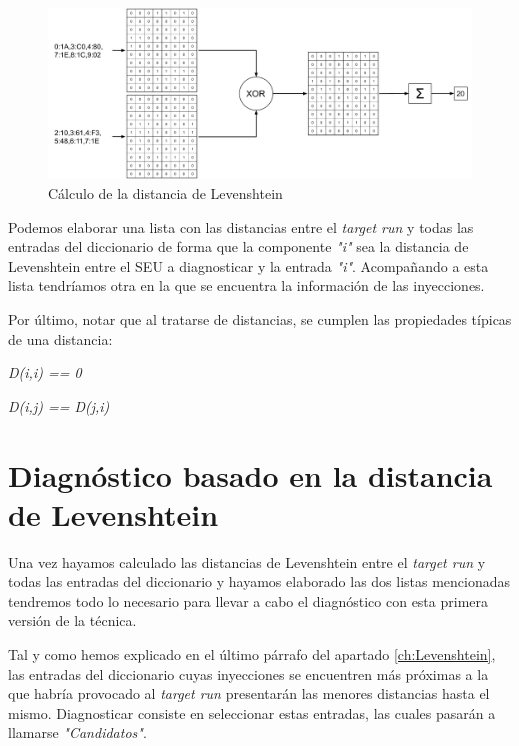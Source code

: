 \begin{figure}[htbp]
    \centering
    \includegraphics[width=0.95\linewidth]
    {Levenshtein/figuras/fig41.pdf}
    \caption{Cálculo de la distancia de Levenshtein}
    \label{fig:LevenDist}
\end{figure}

Podemos elaborar una lista con las distancias entre el \textit{target run} y 
todas las entradas del diccionario de forma que la componente \textit{"i"} sea 
la distancia de Levenshtein entre el \gls{SEU} a diagnosticar y la entrada 
\textit{"i"}. Acompañando a esta lista tendríamos otra en la que se encuentra la
información de las inyecciones. 

Por último, notar que al tratarse de distancias, se cumplen las propiedades
típicas de una distancia: 
\begin{center}
    \textit{D(i,i) == 0}

    \textit{D(i,j) == D(j,i)}
\end{center}

\section{Diagnóstico basado en la distancia de Levenshtein}
\label{sec:LevenCands}
Una vez hayamos calculado las distancias de Levenshtein entre el \textit{target
run} y todas las entradas del diccionario y hayamos elaborado las dos listas
mencionadas tendremos todo lo necesario para llevar a cabo el diagnóstico con esta
primera versión de la técnica. 

Tal y como hemos explicado en el último párrafo del apartado \ref{ch:Levenshtein},
las entradas del diccionario cuyas inyecciones se encuentren más próximas a la
que habría provocado al \textit{target run} presentarán las menores distancias
hasta el mismo. Diagnosticar consiste en seleccionar estas entradas, las cuales
pasarán a llamarse \textit{"Candidatos"}.

